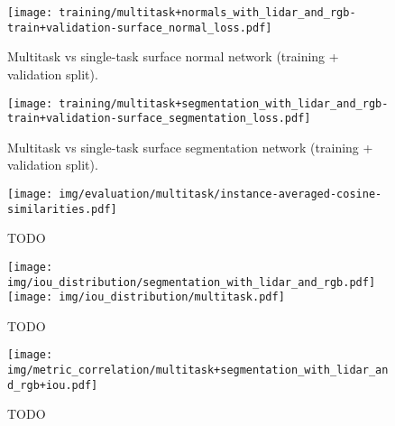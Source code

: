 \begin{figure}
  \texttt{[image: training/multitask+normals\_with\_lidar\_and\_rgb-train+validation-surface\_normal\_loss.pdf]}
  \caption{Multitask vs single-task surface normal network (training + validation split).}
\end{figure}

\begin{figure}
  \texttt{[image: training/multitask+segmentation\_with\_lidar\_and\_rgb-train+validation-surface\_segmentation\_loss.pdf]}
  \caption{Multitask vs single-task surface segmentation network (training + validation split).}
\end{figure}

\begin{figure}
  \texttt{[image: img/evaluation/multitask/instance-averaged-cosine-similarities.pdf]}
  \caption{TODO}
\end{figure}

\begin{figure}
  \texttt{[image: img/iou\_distribution/segmentation\_with\_lidar\_and\_rgb.pdf]}
  \texttt{[image: img/iou\_distribution/multitask.pdf]}
  \caption{TODO}
\end{figure}

\begin{figure}
  \texttt{[image: img/metric\_correlation/multitask+segmentation\_with\_lidar\_and\_rgb+iou.pdf]}
  \caption{TODO}
\end{figure}
